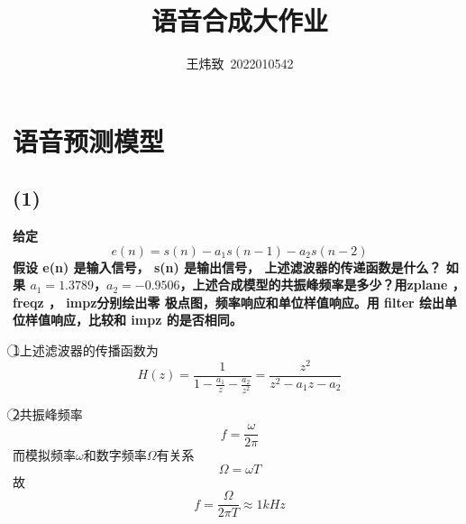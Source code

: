 \documentclass[10pt]{article}
\title{语音合成大作业}
\author{王炜致\ 2022010542}
\date{}
\begin{document}
\maketitle
\section{语音预测模型}
\subsection*{(1)}
\textbf{\color{gray}
给定$$e(n) = s(n) - a_1s(n - 1) - a_2s(n - 2)$$
假设 e(n) 是输入信号， s(n) 是输出信号， 上述滤波器的传递函数是什么？ 如果 $a_1 = 1.3789
$，$a_2 = -0.9506$，上述合成模型的共振峰频率是多少？用zplane ， freqz ， impz分别绘出零
极点图，频率响应和单位样值响应。用 filter 绘出单位样值响应，比较和 impz 的是否相同。}

\textcircled{1}上述滤波器的传播函数为$$H(z)=\frac{1}{1-\frac{a_1}{z}-\frac{a_2}{z^2}} 
=\frac{z^2}{z^2-a_1z-a_2}$$

\textcircled{2}共振峰频率$$f=\frac{\omega}{2\pi}$$
而模拟频率$\omega$和数字频率$\Omega$有关系$$\Omega=\omega T$$
故$$f=\frac{\Omega}{2\pi T}\approx1kHz$$
\end{document}
